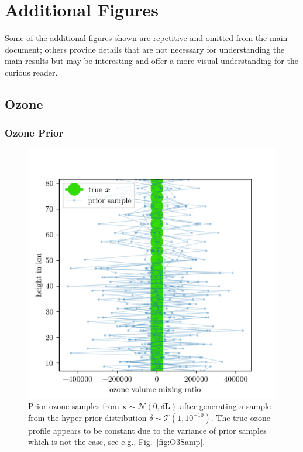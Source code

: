 \chapter{Additional Figures}
\label{ap:addFig}

Some of the additional figures shown are repetitive and omitted from the main document; others provide details that are not necessary for understanding the main results but may be interesting and offer a more visual understanding for the curious reader.
\clearpage
\section{Ozone}
\subsection{Ozone Prior}
\begin{figure}[ht!]
	\centering
	\includegraphics{OzonePrior.png}
	\caption[Samples from ozone prior distribution.]{Prior ozone samples from $\bm{x} \sim \mathcal{N}(0,\delta \bm{L})$ after generating a sample from the hyper-prior distribution $\delta \sim \mathcal{T}(1,10^{-10})$. The true ozone profile appears to be constant due to the variance of prior samples which is not the case, see e.g., Fig.~\ref{fig:O3Samp}.}
	\label{fig:O3Prior}
\end{figure}
\clearpage

